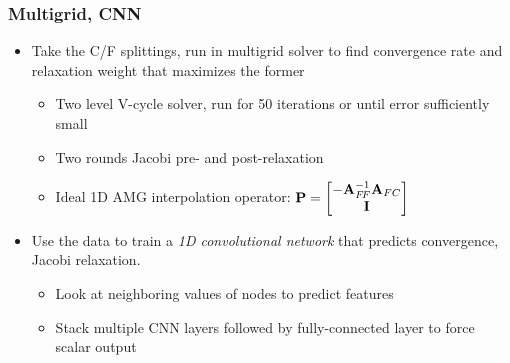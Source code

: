 \documentclass[handout]{beamer}
\renewcommand{\vec}[1]{ {\bf #1} }
\newcommand{\mat}[1]{ \vec{#1} }
\begin{document}
\begin{frame}
  \frametitle{Multigrid, CNN}
  \begin{itemize}
  \item Take the C/F splittings, run in multigrid solver to find convergence rate and relaxation weight that maximizes the former
    \begin{itemize}
    \item Two level V-cycle solver, run for 50 iterations or until error sufficiently small
    \item Two rounds Jacobi pre- and post-relaxation
    \item Ideal 1D AMG interpolation operator: $\mat{P} = \begin{bmatrix} -\mat{A}_{F\!F}^{-1}\mat{A}_{FC} \\ \mat{I} \end{bmatrix}$
    \end{itemize}
  \item Use the data to train a \textit{1D convolutional network} that predicts convergence, Jacobi relaxation.
    \begin{itemize}
    \item Look at neighboring values of nodes to predict features
    \item Stack multiple CNN layers followed by fully-connected layer to force scalar output
    \end{itemize}
  \end{itemize}
\end{frame}
\end{document}

